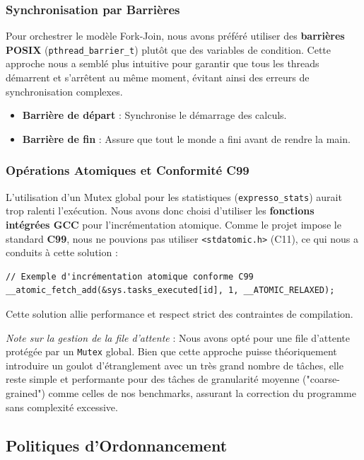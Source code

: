 \documentclass[a4paper,11pt]{article}
\begin{document}
\subsubsection{Synchronisation par Barrières}
Pour orchestrer le modèle Fork-Join, nous avons préféré utiliser des \textbf{barrières POSIX} (\texttt{pthread\_barrier\_t}) plutôt que des variables de condition. Cette approche nous a semblé plus intuitive pour garantir que tous les threads démarrent et s'arrêtent au même moment, évitant ainsi des erreurs de synchronisation complexes.
\begin{itemize}
    \item \textbf{Barrière de départ} : Synchronise le démarrage des calculs.
    \item \textbf{Barrière de fin} : Assure que tout le monde a fini avant de rendre la main.
\end{itemize}

\subsubsection{Opérations Atomiques et Conformité C99}
L'utilisation d'un Mutex global pour les statistiques (\texttt{expresso\_stats}) aurait trop ralenti l'exécution. Nous avons donc choisi d'utiliser les \textbf{fonctions intégrées GCC} pour l'incrémentation atomique. Comme le projet impose le standard \textbf{C99}, nous ne pouvions pas utiliser \texttt{<stdatomic.h>} (C11), ce qui nous a conduits à cette solution :
\begin{lstlisting}
// Exemple d'incrémentation atomique conforme C99
__atomic_fetch_add(&sys.tasks_executed[id], 1, __ATOMIC_RELAXED);
\end{lstlisting}
Cette solution allie performance et respect strict des contraintes de compilation.

\medskip
\textit{Note sur la gestion de la file d'attente} : Nous avons opté pour une file d'attente protégée par un \texttt{Mutex} global. Bien que cette approche puisse théoriquement introduire un goulot d'étranglement avec un très grand nombre de tâches, elle reste simple et performante pour des tâches de granularité moyenne ("coarse-grained") comme celles de nos benchmarks, assurant la correction du programme sans complexité excessive.

\subsection{Politiques d'Ordonnancement}
\end{document}
